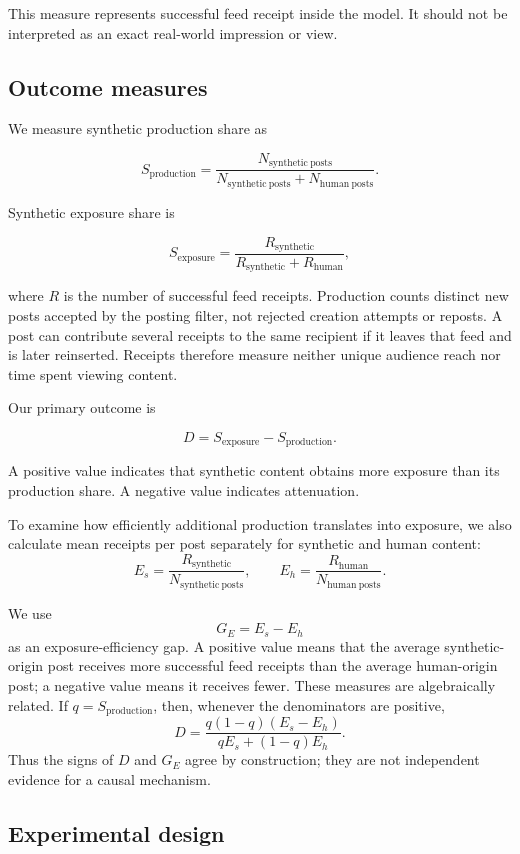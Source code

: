 \documentclass[runningheads]{llncs}
\begin{document}
This measure represents successful feed receipt inside the model. It should not be interpreted as an exact real-world impression or view.

\subsection{Outcome measures}
We measure synthetic production share as

\[
S_{\mathrm{production}} = \frac{N_{\mathrm{synthetic\ posts}}} {N_{\mathrm{synthetic\ posts}}+N_{\mathrm{human\ posts}}}.
\]

Synthetic exposure share is

\[
S_{\mathrm{exposure}} = \frac{R_{\mathrm{synthetic}}} {R_{\mathrm{synthetic}}+R_{\mathrm{human}}},
\]

where \(R\) is the number of successful feed receipts. Production counts distinct new posts accepted by the posting filter, not rejected creation attempts or reposts. A post can contribute several receipts to the same recipient if it leaves that feed and is later reinserted. Receipts therefore measure neither unique audience reach nor time spent viewing content.

Our primary outcome is

\[
D = S_{\mathrm{exposure}}-S_{\mathrm{production}}.
\]

A positive value indicates that synthetic content obtains more exposure than its production share. A negative value indicates attenuation.

To examine how efficiently additional production translates into exposure, we also calculate mean receipts per post separately for synthetic and human content:
\[
E_s = \frac{R_{\mathrm{synthetic}}}{N_{\mathrm{synthetic\ posts}}},
\qquad
E_h = \frac{R_{\mathrm{human}}}{N_{\mathrm{human\ posts}}}.
\]

We use
\[
G_E = E_s-E_h
\]
as an exposure-efficiency gap. A positive value means that the average synthetic-origin post receives more successful feed receipts than the average human-origin post; a negative value means it receives fewer. These measures are algebraically related. If \(q=S_{\mathrm{production}}\), then, whenever the denominators are positive,
\[
D=\frac{q(1-q)(E_s-E_h)}{qE_s+(1-q)E_h}.
\]
Thus the signs of \(D\) and \(G_E\) agree by construction; they are not independent evidence for a causal mechanism.

\subsection{Experimental design}
\end{document}
